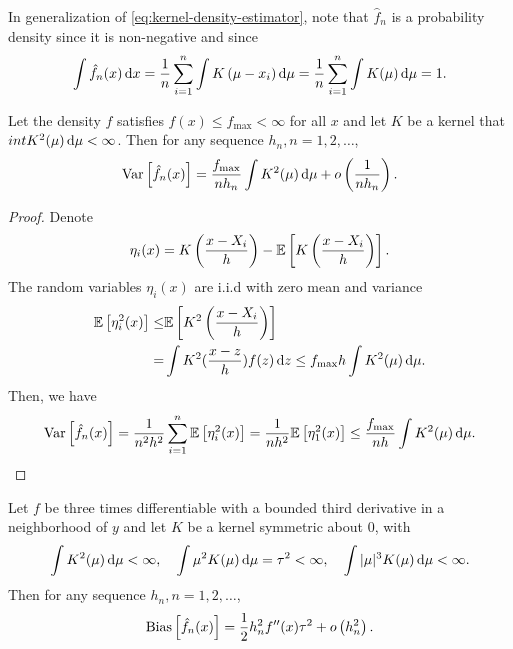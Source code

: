 In generalization of \eqref{eq:kernel-density-estimator}, note that $\hat{f}_{n}$ is a probability density since it is non-negative and since
\begin{equation*}
	\int\hat{f}_{n}(x)\mathop{}\!\mathrm{d} x=\frac{1}{n}\sum_{i=1}^{n}\int K\left(\mu-x_i\right)\mathop{}\!\mathrm{d}\mu=\frac{1}{n}\sum_{i=1}^{n}\int K(\mu)\mathop{}\!\mathrm{d}\mu=1.
\end{equation*}

\begin{theorem}
	Let the density $f$ satisfies $f(x)\leq f_{\max}<\infty$ for all $x$ and let $K$ be a kernel that $int K^2(\mu)\mathop{}\!\mathrm{d}\mu<\infty$. Then for any sequence $h_{n},n=1,2,\ldots$,
	\begin{equation*}
		\mathrm{Var}\left[\hat{f}_{n}(x)\right]= \frac{f_{\max}}{nh_{n}}\int K^2(\mu)\mathop{}\!\mathrm{d}\mu+o\left(\frac{1}{nh_{n}}\right).
	\end{equation*}
\end{theorem}

\begin{proof}
	Denote
	\begin{equation*}
		\eta_{i}(x)=K\left(\frac{x-X_{i}}{h}\right)-{\mathbb E}\left[K\left(\frac{x-X_{i}}{h}\right)\right].
	\end{equation*}
	The random variables $\eta_{i}(x)$ are i.i.d with zero mean and variance
	\begin{equation*}
		\begin{aligned}
			{\mathbb E}\left[\eta_{i}^2(x)\right]\leq & {\mathbb E}\left[K^2\left(\frac{x-X_{i}}{h}\right)\right]                   \\
			=                                  & \int K^2(\frac{x-z}{h})f(z)\mathop{}\!\mathrm{d} z\leq f_{\max}h\int K^2(\mu)\mathop{}\!\mathrm{d}\mu.
		\end{aligned}
	\end{equation*}
	Then, we have
	\begin{equation*}
		\mathrm{Var}\left[\hat{f}_{n}(x)\right]=\frac{1}{n^2h^2}\sum_{i=1}^{n}{\mathbb E}\left[\eta_{i}^2(x)\right]=\frac{1}{nh^2}{\mathbb E}\left[\eta_{1}^2(x)\right]\leq \frac{f_{\max}}{nh} \int K^2(\mu)\mathop{}\!\mathrm{d}\mu.
	\end{equation*}
\end{proof}

\begin{theorem}
	Let $f$ be three times differentiable with a bounded third derivative in a neighborhood of $y$ and let $K$ be a kernel symmetric about $0$, with
	\begin{equation*}
		\int K^2(\mu)\mathop{}\!\mathrm{d}\mu<\infty,\quad\int\mu^2K(\mu)\mathop{}\!\mathrm{d}\mu=\tau^2<\infty,\quad\int|\mu|^3 K(\mu)\mathop{}\!\mathrm{d}\mu<\infty.
	\end{equation*}
	Then for any sequence $h_{n},n=1,2,\ldots$,
	\begin{equation*}
		\mathrm{Bias}\left[\hat{f}_{n}(x)\right]=\frac{1}{2}h_{n}^2f^{\prime\prime}(x)\tau^2+o\left(h_{n}^2\right).
	\end{equation*}
\end{theorem}

